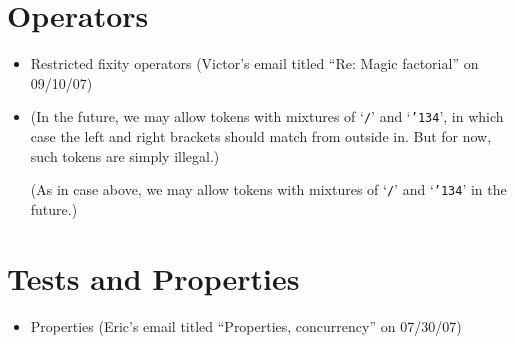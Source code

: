 \section{Operators}
\begin{itemize}
\item Restricted fixity operators (Victor's email titled ``Re: Magic factorial'' on 09/10/07)

\item {}

(In the future,
we may allow tokens with mixtures of `\texttt{/}' and `\texttt{\char'134}',
in which case the left and right brackets should match from outside in.
But for now, such tokens are simply illegal.)

(As in case %
above,
we may allow tokens with mixtures of `\texttt{/}' and `\texttt{\char'134}'
in the future.)
\end{itemize}

\section{Tests and Properties}
\begin{itemize}
\item Properties (Eric's email titled ``Properties, concurrency'' on 07/30/07)
\end{itemize}


